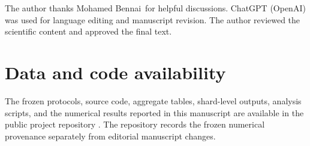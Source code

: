 \documentclass[aps,prx,reprint,superscriptaddress,nofootinbib,longbibliography]{revtex4-2}
\begin{document}
\begin{acknowledgments}
The author thanks Mohamed Bennai\, for helpful discussions. ChatGPT (OpenAI) was used for language editing and manuscript revision. The author reviewed the scientific content and approved the final text.
\end{acknowledgments}

\section*{Data and code availability}
The frozen protocols, source code, aggregate tables, shard-level outputs, analysis scripts, and the numerical results reported in this manuscript are available in the public project repository \cite{AitHaddou2026MeasurementAccessible}. The repository records the frozen numerical provenance separately from editorial manuscript changes.
\end{document}
